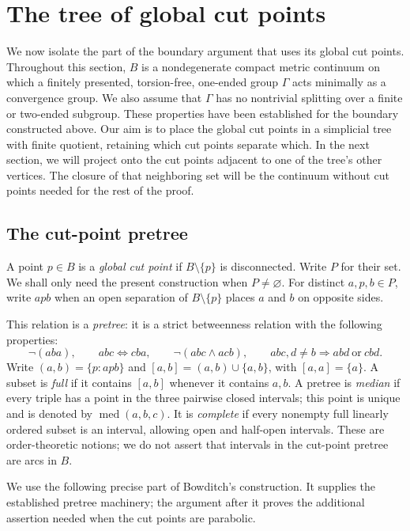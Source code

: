 \section{The tree of global cut points}\label{sec:pretree}

We now isolate the part of the boundary argument that uses its global cut
points.  Throughout this section, $B$ is a nondegenerate compact metric
continuum on which a finitely presented, torsion-free, one-ended group
$\Gamma$ acts minimally as a convergence group.  We also assume that
$\Gamma$ has no nontrivial splitting over a finite or two-ended subgroup.
These properties have been established for the boundary constructed above.
Our aim is to place the global cut points in a simplicial tree with finite
quotient, retaining which cut points separate which. In the next section,
we will project onto the cut points adjacent to one of the tree's other
vertices. The closure of that neighboring set will be the continuum
without cut points needed for the rest of the proof.

\subsection{The cut-point pretree}

A point $p\in B$ is a \emph{global cut point} if
$B\setminus\{p\}$ is disconnected.  Write $P$ for their set.  We shall only
need the present construction when $P\ne\varnothing$.  For distinct
$a,p,b\in P$, write $apb$ when an open separation of
$B\setminus\{p\}$ places $a$ and $b$ on opposite sides.

This relation is a \emph{pretree}: it is a strict betweenness relation with
the following properties:
\[
 \neg(aba),\qquad
 abc\Longleftrightarrow cba,\qquad
 \neg(abc\wedge acb),\qquad
 abc, d\ne b\Longrightarrow abd\ \text{or}\ cbd.
\]
Write $(a,b)=\{p:apb\}$ and $[a,b]=(a,b)\cup\{a,b\}$, with
$[a,a]=\{a\}$.  A subset is \emph{full} if it contains $[a,b]$ whenever
it contains $a,b$.  A pretree is \emph{median} if every triple has a point
in the three pairwise closed intervals; this point is unique and is
denoted by $\operatorname{med}(a,b,c)$.  It is \emph{complete} if every
nonempty full linearly ordered subset is an interval, allowing open and
half-open intervals.  These are order-theoretic notions; we do not assert
that intervals in the cut-point pretree are arcs in $B$.

We use the following precise part of Bowditch's construction.  It supplies
the established pretree machinery; the argument after it proves the
additional assertion needed when the cut points are parabolic.


